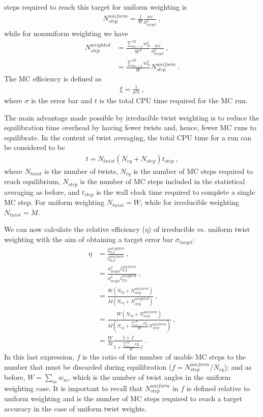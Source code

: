 steps required to reach this target for uniform weighting is
\begin{align}
  N_{step}^{uniform} = \frac{1}{W}\frac{\kappa v}{\sigma_{target}^2}\:,
\end{align}
while for nonuniform weighting we have
\begin{align}\label{eq:weighted_step}
  N_{step}^{weighted} &= \frac{\sum_{m=1}^Mw_m^2}{W^2}\frac{\kappa v}{\sigma_{target}^2} \nonumber\:,\\
                  &=\frac{\sum_{m=1}^Mw_m^2}{W}N_{step}^{uniform}\:.
\end{align}
The MC efficiency is defined as 
\begin{align}
  \xi = \frac{1}{\sigma^2t}\:,
\end{align}
where $\sigma$ is the error bar and $t$ is the total CPU time required 
for the MC run.  

The main advantage made possible by irreducible twist weighting is to 
reduce the equilibration time overhead by having fewer twists and, 
hence, fewer MC runs to equilibrate.  In the context of twist 
averaging, the total CPU time for a run can be considered to be
\begin{align}
  t=N_{twist}(N_{eq}+N_{step})t_{step}\:,
\end{align}
where $N_{twist}$ is the number of twists, $N_{eq}$ is the number of MC steps required to reach equilibrium, $N_{step}$ is the number 
of MC steps included in the statistical averaging as before, 
and $t_{step}$ is the wall clock time required to complete a single 
MC step. For uniform weighting $N_{twist}=W$; while for irreducible 
weighting $N_{twist}=M$.

We can now calculate the relative efficiency ($\eta$) of irreducible vs. 
uniform twist weighting with the aim of obtaining a target error bar 
$\sigma_{target}$:
\begin{align}
  \eta &= \frac{\xi_{TA}^{weighted}}{\xi_{TA}^{uniform}} \nonumber\:, \\
       &= \frac{\sigma_{target}^2t_{TA}^{uniform}}{\sigma_{target}^2t_{TA}^{weighted}} \nonumber\:, \\
       &= \frac{W(N_{eq}+N_{step}^{uniform})}{M(N_{eq}+N_{step}^{weighted})} \nonumber\:, \\
       &= \frac{W(N_{eq}+N_{step}^{uniform})}{M(N_{eq}+\frac{\sum_{m=1}^Mw_m^2}{W}N_{step}^{uniform})} \nonumber\:, \\
       &= \frac{W}{M}\frac{1+f}{1+\frac{\sum_{m=1}^Mw_m^2}{W}f}\:.
\end{align}
In this last expression, $f$ is the ratio of the number of usable 
MC steps to the number that must be discarded during equilibration 
($f=N_{step}^{uniform}/N_{eq}$); and as before, $W=\sum_mw_m$, which is the number of 
twist angles in the uniform weighting case.  It is important to recall 
that $N_{step}^{uniform}$ in $f$ is defined relative to uniform weighting and is 
the number of MC steps required to reach a target accuracy in the 
case of uniform twist weights.

